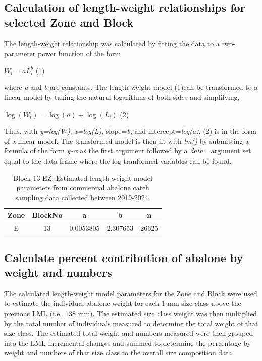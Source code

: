 \documentclass[
]{article}
\begin{document}
\subsection{Calculation of length-weight relationships for selected Zone and Block}\label{calculation-of-length-weight-relationships-for-selected-zone-and-block}

The length-weight relationship was calculated by fitting the data to a two-parameter power function of the form

\(W_{i} = aL_{i}^{b}\) (1)

where \emph{a} and \emph{b} are constants. The length-weight model (1)can be transformed to a linear model by taking the natural logarithms of both sides and simplifying,

\(\log(W_{i}) = \log(a) + \log(L_{i})\) (2)

Thus, with \emph{y=log(W)}, \emph{x=log(L)}, slope=\emph{b}, and intercept=\emph{log(a)}, (2) is in the form of a linear model. The transformed model is then fit with \emph{lm()} by submitting a formula of the form \emph{y\textasciitilde x} as the first argument followed by a \emph{data=} argument set equal to the data frame where the log-tranformed variables can be found.

\begin{table}[!h]
\centering
\caption{\label{tab:lengthweightrelationship}Block 13 EZ: Estimated length-weight model parameters from commercial abalone catch sampling data collected between 2019-2024.}
\centering
\begin{tabular}[t]{ccccc}
\toprule
Zone & BlockNo & a & b & n\\
\midrule
E & 13 & 0.0053805 & 2.307653 & 26625\\
\bottomrule
\end{tabular}
\end{table}

\subsection{Calculate percent contribution of abalone by weight and numbers}\label{calculate-percent-contribution-of-abalone-by-weight-and-numbers}

The calculated length-weight model parameters for the Zone and Block were used to estimate the individual abalone weight for each 1 mm size class above the previous LML (i.e.~138 mm). The estimated size class weight was then multiplied by the total number of individuals measured to determine the total weight of that size class. The estimated total weight and numbers measured were then grouped into the LML incremental changes and summed to determine the percentage by weight and numbers of that size class to the overall size composition data.
\end{document}
